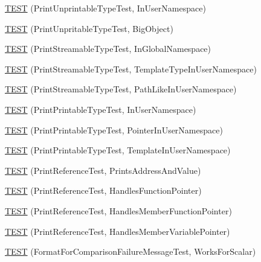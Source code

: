 \begin{DoxyCompactItemize}
\item 
\mbox{\hyperlink{namespacetesting_1_1gtest__printers__test_a0aa1499e978bdde6c71e49ecc9db695b}{T\+E\+ST}} (Print\+Unprintable\+Type\+Test, In\+User\+Namespace)
\item 
\mbox{\hyperlink{namespacetesting_1_1gtest__printers__test_a6b6fba2a191094244f8aa78a4933a2c5}{T\+E\+ST}} (Print\+Unpritable\+Type\+Test, Big\+Object)
\item 
\mbox{\hyperlink{namespacetesting_1_1gtest__printers__test_a80fe9d71227a97b12fd5336a823c3d17}{T\+E\+ST}} (Print\+Streamable\+Type\+Test, In\+Global\+Namespace)
\item 
\mbox{\hyperlink{namespacetesting_1_1gtest__printers__test_a8ccd96504d676671a0429073d5012ff1}{T\+E\+ST}} (Print\+Streamable\+Type\+Test, Template\+Type\+In\+User\+Namespace)
\item 
\mbox{\hyperlink{namespacetesting_1_1gtest__printers__test_a243b88c8a03fb501c573c25da302ca98}{T\+E\+ST}} (Print\+Streamable\+Type\+Test, Path\+Like\+In\+User\+Namespace)
\item 
\mbox{\hyperlink{namespacetesting_1_1gtest__printers__test_a52f5df394111bcc55aecc59ce426088d}{T\+E\+ST}} (Print\+Printable\+Type\+Test, In\+User\+Namespace)
\item 
\mbox{\hyperlink{namespacetesting_1_1gtest__printers__test_a3da6191eff6b016540024c2bfccdd90b}{T\+E\+ST}} (Print\+Printable\+Type\+Test, Pointer\+In\+User\+Namespace)
\item 
\mbox{\hyperlink{namespacetesting_1_1gtest__printers__test_aa697a3cf25b7f51f26ab49ed8ac3dd31}{T\+E\+ST}} (Print\+Printable\+Type\+Test, Template\+In\+User\+Namespace)
\item 
\mbox{\hyperlink{namespacetesting_1_1gtest__printers__test_aeae9b61a9fe582c72580db1466631846}{T\+E\+ST}} (Print\+Reference\+Test, Prints\+Address\+And\+Value)
\item 
\mbox{\hyperlink{namespacetesting_1_1gtest__printers__test_aab47074bb60b087e80675a44ad8c88ba}{T\+E\+ST}} (Print\+Reference\+Test, Handles\+Function\+Pointer)
\item 
\mbox{\hyperlink{namespacetesting_1_1gtest__printers__test_a88f9089e0b19be4bda74a953d6a47d7b}{T\+E\+ST}} (Print\+Reference\+Test, Handles\+Member\+Function\+Pointer)
\item 
\mbox{\hyperlink{namespacetesting_1_1gtest__printers__test_af9c63486049ac0ec2a1db65904702eb3}{T\+E\+ST}} (Print\+Reference\+Test, Handles\+Member\+Variable\+Pointer)
\item 
\mbox{\hyperlink{namespacetesting_1_1gtest__printers__test_aa7429c3701e464d0047a82686a5e8a46}{T\+E\+ST}} (Format\+For\+Comparison\+Failure\+Message\+Test, Works\+For\+Scalar)

\end{DoxyCompactItemize}

